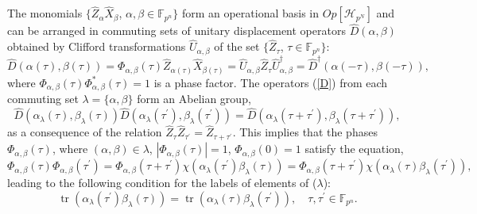 \documentclass{article}
\DeclareMathOperator{\tr}{tr}
\begin{document}
The monomials $\{\hat{Z}_{\alpha }\hat{X}_{\beta }$, $\alpha ,\beta \in
\mathbb{F}_{p^{n}}\}$ form an operational basis in $Op[\mathcal{H}_{p^{N}}]$ and
can be arranged in commuting sets of unitary displacement operators $
\hat{D}(\alpha,\beta)$ obtained by Clifford transformations
$\hat{U}_{\alpha,\beta}$ of the set $\{\hat{Z}_{\tau}$, $\tau \in \mathbb{F}
_{p^{n}}\}$:
\begin{equation}
  \hat{D}\left( \alpha (\tau ),\beta (\tau )\right)
  = \Phi_{\alpha,\beta}\left( \tau \right)
  \hat{Z}_{\alpha (\tau )}\hat{X}_{\beta (\tau )}
  = \hat{U}_{\alpha,\beta }\hat{Z}_{\tau }\hat{U}_{\alpha,\beta }^{\dagger }
  =\hat{D}^{\dagger }\left( \alpha (-\tau ),\beta (-\tau )\right), 
  \label{D}
\end{equation}
where $\Phi_{\alpha ,\beta }\left( \tau \right) \Phi _{\alpha ,\beta }^{\ast
}\left( \tau \right) =1$ is a phase factor. The operators (\ref{D}) from each
commuting set $\lambda =\{\alpha,\beta\}$ form an Abelian group,
\begin{equation}
\hat{D}\left(
  \alpha_{\lambda}(\tau),\beta_{\lambda }(\tau)
\right)
\hat{D}\left(
  \alpha_{\lambda}(\tau^{\prime }),\beta_{\lambda }(\tau^{\prime })
\right)
= \hat{D}\left(\alpha_{\lambda}(\tau + \tau^{\prime}), \beta_{\lambda}(\tau +
\tau^{\prime })\right),
\label{DD}
\end{equation}
as a consequence of the relation $\hat{Z}_{\tau }\hat{Z}_{\tau ^{\prime }}=
\hat{Z}_{\tau +\tau ^{\prime }}$. This implies that the phases $\Phi
_{\alpha,\beta }\left( \tau \right) $, where $(\alpha ,\beta )\in \lambda $,
$|\Phi _{\alpha ,\beta }\left( \tau \right) |=1$,
$\Phi_{\alpha,\beta}\left(0\right) = 1$ satisfy the equation, 
\begin{equation}
  \Phi_{\alpha,\beta }\left( \tau \right)
  \Phi_{\alpha,\beta }\left( \tau^{\prime}\right)
  = \Phi_{\alpha,\beta }\left( \tau +\tau^{\prime }\right)
  \chi \left(\alpha _{\lambda}(\tau^{\prime})\beta_{\lambda}(\tau)\right)
  = \Phi_{\alpha,\beta}\left(\tau + \tau^{\prime}\right)
  \chi\left(\alpha_{\lambda}(\tau)\beta_{\lambda}(\tau^{\prime })\right),
  \label{Phi}
\end{equation}
leading to the following condition for the labels of elements of ($\lambda$): 
\begin{equation}
  \tr\left(\alpha_{\lambda}(\tau^{\prime })\beta_{\lambda }(\tau)\right)
  = \tr\left(\alpha_{\lambda}(\tau)\beta_{\lambda }(\tau^{\prime })\right),
  \quad \tau,\tau^{\prime} \in \mathbb{F}_{p^{n}}. 
  \label{CC}
\end{equation}
\end{document}

